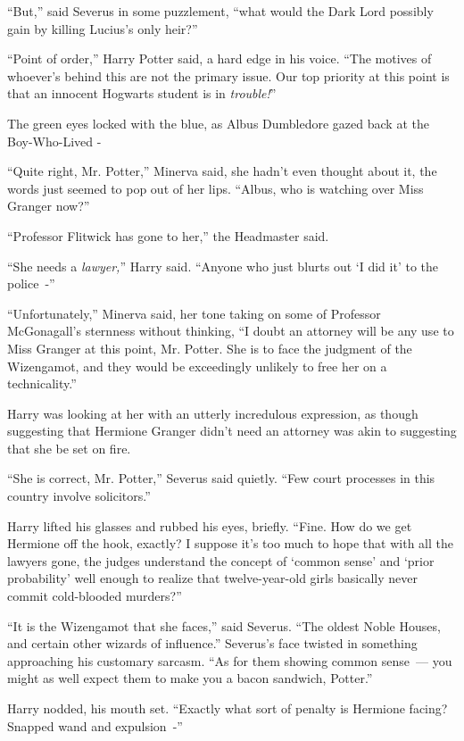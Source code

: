 ``But,'' said Severus in some puzzlement, ``what would the Dark Lord possibly gain by killing Lucius's only heir?''

``Point of order,'' Harry Potter said, a hard edge in his voice. ``The motives of whoever's behind this are not the primary issue. Our top priority at this point is that an innocent Hogwarts student is in \emph{trouble!}''

The green eyes locked with the blue, as Albus Dumbledore gazed back at the Boy-Who-Lived -

``Quite right, Mr. Potter,'' Minerva said, she hadn't even thought about it, the words just seemed to pop out of her lips. ``Albus, who is watching over Miss Granger now?''

``Professor Flitwick has gone to her,'' the Headmaster said.

``She needs a \emph{lawyer,}'' Harry said. ``Anyone who just blurts out `I did it' to the police~-''

``Unfortunately,'' Minerva said, her tone taking on some of Professor McGonagall's sternness without thinking, ``I doubt an attorney will be any use to Miss Granger at this point, Mr. Potter. She is to face the judgment of the Wizengamot, and they would be exceedingly unlikely to free her on a technicality.''

Harry was looking at her with an utterly incredulous expression, as though suggesting that Hermione Granger didn't need an attorney was akin to suggesting that she be set on fire.

``She is correct, Mr. Potter,'' Severus said quietly. ``Few court processes in this country involve solicitors.''

Harry lifted his glasses and rubbed his eyes, briefly. ``Fine. How do we get Hermione off the hook, exactly? I suppose it's too much to hope that with all the lawyers gone, the judges understand the concept of `common sense' and `prior probability' well enough to realize that twelve-year-old girls basically never commit cold-blooded murders?''

``It is the Wizengamot that she faces,'' said Severus. ``The oldest Noble Houses, and certain other wizards of influence.'' Severus's face twisted in something approaching his customary sarcasm. ``As for them showing common sense~--- you might as well expect them to make you a bacon sandwich, Potter.''

Harry nodded, his mouth set. ``Exactly what sort of penalty is Hermione facing? Snapped wand and expulsion~-''


